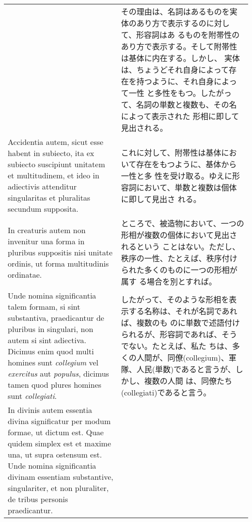 \documentclass[10pt]{jsarticle} %
\begin{document}
\begin{longtable}{p{21em}p{21em}}
&

その理由は、名詞はあるものを実体のあり方で表示するのに対して、形容詞はあ
 るものを附帯性のあり方で表示する。そして附帯性は基体に内在する。しかし、
 実体は、ちょうどそれ自身によって存在を持つように、それ自身によって一性
 と多性をもつ。したがって、名詞の単数と複数も、その名によって表示された
 形相に即して見出される。


\\


Accidentia autem, sicut esse habent in subiecto, ita ex subiecto
suscipiunt unitatem et multitudinem, et ideo in adiectivis attenditur
singularitas et pluralitas secundum supposita. 

&

これに対して、附帯性は基体において存在をもつように、基体から一性と多
 性を受け取る。ゆえに形容詞において、単数と複数は個体に即して見出さ
 れる。


\\

In creaturis autem non
invenitur una forma in pluribus suppositis nisi unitate ordinis, ut
forma multitudinis ordinatae. 



&

ところで、被造物において、一つの形相が複数の個体において見出されるという
 ことはない。ただし、秩序の一性、たとえば、秩序付けられた多くのものに一つの形相が属す
 る場合を別とすれば。



\\


Unde nomina significantia talem formam, si
sint substantiva, praedicantur de pluribus in singulari, non autem si
sint adiectiva. Dicimus enim quod multi homines sunt {\itshape collegium} vel
{\itshape exercitus} aut {\itshape populus}, dicimus tamen quod plures homines sunt
{\itshape collegiati}. 



&

したがって、そのような形相を表示する名称は、それが名詞であれば、複数のも
 のに単数で述語付けられるが、形容詞であれば、そうでない。たとえば、私た
 ちは、多くの人間が、同僚(collegium)、軍隊、人民(単数)であると言うが、しかし、複数の人間
 は、同僚たち(collegiati)であると言う。


\\


In divinis autem essentia divina significatur per modum
formae, ut dictum est. Quae quidem simplex est et maxime una, ut supra
ostensum est. Unde nomina significantia divinam essentiam substantive,
singulariter, et non pluraliter, de tribus personis praedicantur. 




\end{longtable}
\end{document}
